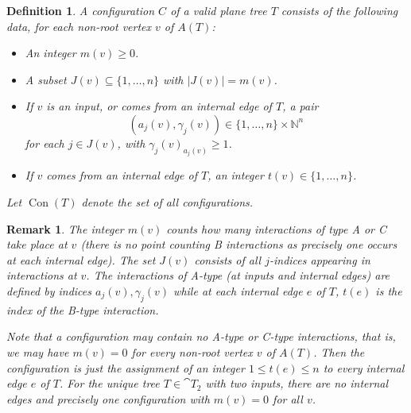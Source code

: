 \documentclass[english,letter paper,12pt,leqno]{article}
\theoremstyle{example}
\newtheorem{definition}[theorem]{Definition}
\newtheorem{remark}[theorem]{Remark}
\numberwithin{equation}{section}
\begin{document}
\begin{definition}\label{defn:config} A \emph{configuration} $C$ of a valid plane tree $T$ consists of the following data, for each non-root vertex $v$ of $A(T)$:
\begin{itemize}
\item An integer $m(v) \ge 0$.
\item A subset $J(v) \subseteq \{ 1,\ldots, n \}$ with $|J(v)| = m(v)$. 
\item If $v$ is an input, or comes from an internal edge of $T$, a pair
\[
( a_j(v), \gamma_j(v) ) \in \{ 1, \ldots, n \} \times \mathbb{N}^n
\]
for each $j \in J(v)$, with $\gamma_j(v)_{a_j(v)} \ge 1$.
\item If $v$ comes from an internal edge of $T$, an integer $t(v) \in \{1,\ldots,n\}$.
\end{itemize}
Let $\operatorname{Con}(T)$ denote the set of all configurations.
\end{definition} 

\begin{remark}\label{remark:config_count} The integer $m(v)$ counts how many interactions of type A or C take place at $v$ (there is no point counting B interactions as precisely one occurs at each internal edge). The set $J(v)$ consists of all $j$-indices appearing in interactions at $v$. The interactions of A-type (at inputs and internal edges) are defined by indices $a_j(v), \gamma_j(v)$ while at each internal edge $e$ of $T$, $t(e)$ is the index of the B-type interaction.

Note that a configuration may contain no A-type or C-type interactions, that is, we may have $m(v) = 0$ for every non-root vertex $v$ of $A(T)$. Then the configuration is just the assignment of an integer $1 \le t(e) \le n$ to every internal edge $e$ of $T$. For the unique tree $T \in \cat{T}_2$ with two inputs, there are no internal edges and precisely one configuration with $m(v) = 0$ for all $v$.
\end{remark}
\end{document}
